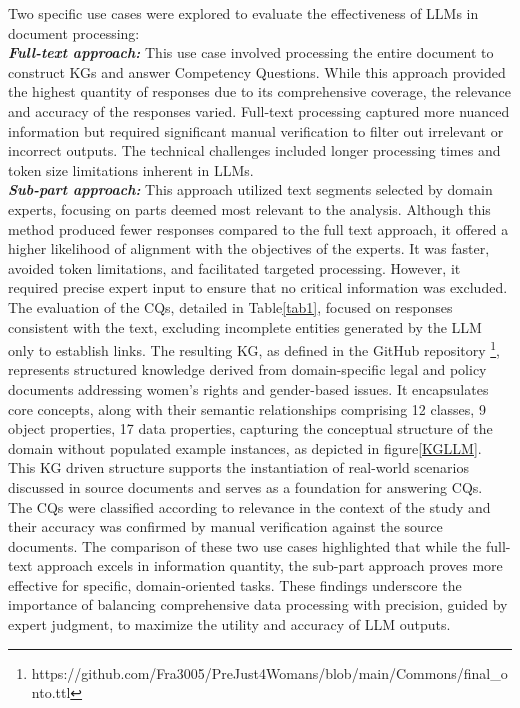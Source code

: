 \documentclass[runningheads]{llncs}
\begin{document}
Two specific use cases were explored to evaluate the effectiveness of LLMs in document processing:\\
\textbf{\textit{Full-text approach:}} This use case involved processing the entire document to construct KGs and answer Competency Questions. While this approach provided the highest quantity of responses due to its comprehensive coverage, the relevance and accuracy of the responses varied. Full-text processing captured more nuanced information but required significant manual verification to filter out irrelevant or incorrect outputs. The technical challenges included longer processing times and token size limitations inherent in LLMs.\\
\textbf{\textit{Sub-part approach:}} This approach utilized text segments selected by domain experts, focusing on parts deemed most relevant to the analysis. Although this method produced fewer responses compared to the full text approach, it offered a higher likelihood of alignment with the objectives of the experts. It was faster, avoided token limitations, and facilitated targeted processing. However, it required precise expert input to ensure that no critical information was excluded.\\
The evaluation of the CQs, detailed in Table\ref{tab1}, focused on responses consistent with the text, excluding incomplete entities generated by the LLM only to establish links. The resulting KG, as defined in the GitHub repository \footnote{https://github.com/Fra3005/PreJust4Womans/blob/main/Commons/final\_onto.ttl},  represents structured knowledge derived from domain-specific legal and policy documents addressing women's rights and gender-based issues. It encapsulates core concepts, along with their semantic relationships comprising 12 classes, 9 object properties, 17 data properties, capturing the conceptual structure of the domain without populated example instances, as depicted in figure\ref{KGLLM}. This KG driven structure supports the instantiation of real-world scenarios discussed in source documents and serves as a foundation for answering CQs.\\
The CQs were classified according to relevance in the context of the study and their accuracy was confirmed by manual verification against the source documents. The comparison of these two use cases highlighted that while the full-text approach excels in information quantity, the sub-part approach proves more effective for specific, domain-oriented tasks. These findings underscore the importance of balancing comprehensive data processing with precision, guided by expert judgment, to maximize the utility and accuracy of LLM outputs.
\end{document}
